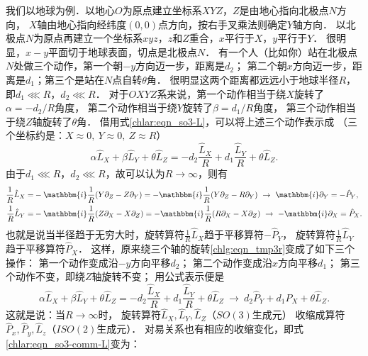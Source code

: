 我们以地球为例．以地心$O$为原点建立坐标系$XYZ$，$Z$是由地心指向北极点$N$方向，
$X$轴由地心指向经纬度$(0,0)$点方向，按右手叉乘法则确定$Y$轴方向．
以北极点$N$为原点再建立一个坐标系$xyz$，$z$和$Z$重合，$x$平行于$X$，$y$平行于$Y$．
很明显，$x-y$平面切于地球表面，切点是北极点$N$．
有一个人（比如你）站在北极点$N$处做三个动作，第一个朝$-y$方向迈一步，距离是$d_2$；
第二个朝$x$方向迈一步，距离是$d_1$；第三个是站在$N$点自转$\theta$角．
很明显这两个距离都远远小于地球半径$R$，即$d_1 \lll R$，$d_2\lll R$．
对于$OXYZ$系来说，第一个动作相当于绕$X$旋转了$\alpha=-d_2/R$角度，
第二个动作相当于绕$Y$旋转了$\beta=d_1/R$角度，
第三个动作相当于绕$Z$轴旋转了$\theta$角．
借用式\eqref{chlar:eqn_so3-L}，可以将上述三个动作表示成
（三个坐标约是：$X\approx 0,\ Y\approx 0,\  Z\approx R$）
\begin{equation}\label{chlg:eqn_tmp3r}
    \alpha \hat{L}_X + \beta \hat{L}_Y + \theta \hat{L}_Z
    =-d_2\frac{\hat{L}_X}{R}  + d_1\frac{\hat{L}_Y}{R}  + \theta \hat{L}_Z.
\end{equation}
由于$d_1 \lll R$，$d_2\lll R$，故可以认为$R\to \infty$，则有
    \begin{align*}
        \frac{1}{R}\hat{L}_X =& -\mathbbm{i} \frac{1}{R} (Y \partial_Z - Z \partial_Y )
        =-\mathbbm{i} \frac{1}{R} (Y \partial_Z - R \partial_Y )
        \ \to\ \mathbbm{i} \partial_Y = -\hat{P}_Y, \\
        \frac{1}{R}\hat{L}_Y =& -\mathbbm{i} \frac{1}{R} (Z \partial_X - X \partial_Z ) 
        =-\mathbbm{i} \frac{1}{R} (R \partial_X - X \partial_Z )
        \ \to\ -\mathbbm{i} \partial_X = \hat{P}_X .
    \end{align*}
也就是说当半径趋于无穷大时，旋转算符$\frac{1}{R}\hat{L}_X$趋于平移算符$-\hat{P}_Y$，
旋转算符$\frac{1}{R}\hat{L}_Y$趋于平移算符$\hat{P}_X$．
这样，原来绕三个轴的旋转\eqref{chlg:eqn_tmp3r}变成了如下三个操作：
第一个动作变成沿$-y$方向平移$d_2$；
第二个动作变成沿$x$方向平移$d_1$；
第三个动作不变，即绕$Z$轴旋转不变；
用公式表示便是
\begin{equation}\label{chlg:eqn_tmp-rpp}
    \alpha \hat{L}_X + \beta \hat{L}_Y + \theta \hat{L}_Z
    =-d_2\frac{\hat{L}_X}{R}  + d_1\frac{\hat{L}_Y}{R}  + \theta \hat{L}_Z
    \ \to \    d_2\hat{P}_Y  + d_1 \hat{P}_X  + \theta \hat{L}_Z .
\end{equation}
这就是说：当$R\to \infty$时，
旋转算符$\hat{L}_X,\hat{L}_Y,\hat{L}_Z$（$SO(3)$生成元）
收缩成算符$\hat{P}_x,\hat{P}_y,\hat{L}_z$（$ISO(2)$生成元）．
对易关系也有相应的收缩变化，即式\eqref{chlar:eqn_so3-comm-L}变为：
